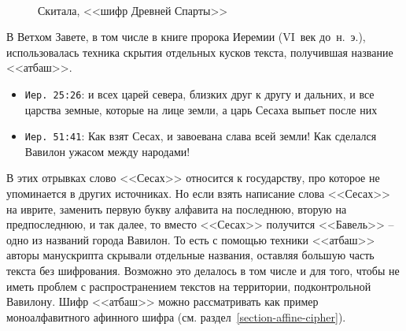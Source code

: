 \begin{figure}[t]
	\centering
	~~~~
	\caption{Скитала, <<шифр Древней Спарты>>}
\end{figure}

В Ветхом Завете, в том числе в книге пророка Иеремии (VI~век до~н.~э.), использовалась техника скрытия отдельных кусков текста, получившая название <<атбаш>>.

\begin{itemize}
	\item \texttt{Иер. 25:26}: и всех царей севера, близких друг к другу и дальних, и все царства земные, которые на лице земли, а царь Сесаха выпьет после них
	\item \texttt{Иер. 51:41}: Как взят Сесах, и завоевана слава всей земли! Как сделался Вавилон ужасом между народами!
\end{itemize}

В этих отрывках слово <<Сесах>> относится к государству, про которое не упоминается в других источниках. Но если взять написание слова <<Сесах>> на иврите, заменить первую букву алфавита на последнюю, вторую на предпоследнюю, и так далее, то вместо <<Сесах>> получится <<Бавель>> -- одно из названий города Вавилон. То есть с помощью техники <<атбаш>> авторы манускрипта скрывали отдельные названия, оставляя большую часть текста без шифрования. Возможно это делалось в том числе и для того, чтобы не иметь проблем с распространением текстов на территории, подконтрольной Вавилону. Шифр <<атбаш>> можно рассматривать как пример моноалфавитного афинного шифра (см. раздел~\ref{section-affine-cipher}).

